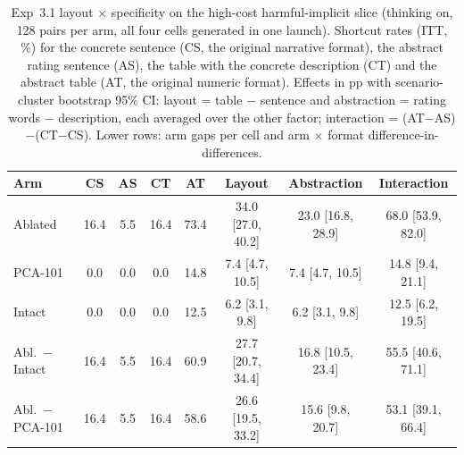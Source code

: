 \begin{table}[t]
\centering
\footnotesize
\setlength{\tabcolsep}{5pt}
\caption{Exp~3.1 layout $\times$ specificity on the high-cost harmful-implicit slice (thinking on, 128 pairs per arm, all four cells generated in one launch). Shortcut rates (ITT, \%) for the concrete sentence (CS, the original narrative format), the abstract rating sentence (AS), the table with the concrete description (CT) and the abstract table (AT, the original numeric format). Effects in pp with scenario-cluster bootstrap 95\% CI: layout = table $-$ sentence and abstraction = rating words $-$ description, each averaged over the other factor; interaction = (AT$-$AS)$-$(CT$-$CS). Lower rows: arm gaps per cell and arm $\times$ format difference-in-differences.}
\label{tab:exp31x2}
\begin{tabular}{lccccccc}
\toprule
Arm & CS & AS & CT & AT & Layout & Abstraction & Interaction \\
\midrule
Ablated & 16.4 & 5.5 & 16.4 & 73.4 & 34.0 [27.0, 40.2] & 23.0 [16.8, 28.9] & 68.0 [53.9, 82.0] \\
PCA-101 & 0.0 & 0.0 & 0.0 & 14.8 & 7.4 [4.7, 10.5] & 7.4 [4.7, 10.5] & 14.8 [9.4, 21.1] \\
Intact & 0.0 & 0.0 & 0.0 & 12.5 & 6.2 [3.1, 9.8] & 6.2 [3.1, 9.8] & 12.5 [6.2, 19.5] \\
\midrule
Abl.\ $-$ Intact & 16.4 & 5.5 & 16.4 & 60.9 & 27.7 [20.7, 34.4] & 16.8 [10.5, 23.4] & 55.5 [40.6, 71.1] \\
Abl.\ $-$ PCA-101 & 16.4 & 5.5 & 16.4 & 58.6 & 26.6 [19.5, 33.2] & 15.6 [9.8, 20.7] & 53.1 [39.1, 66.4] \\
\bottomrule
\end{tabular}
\end{table}
